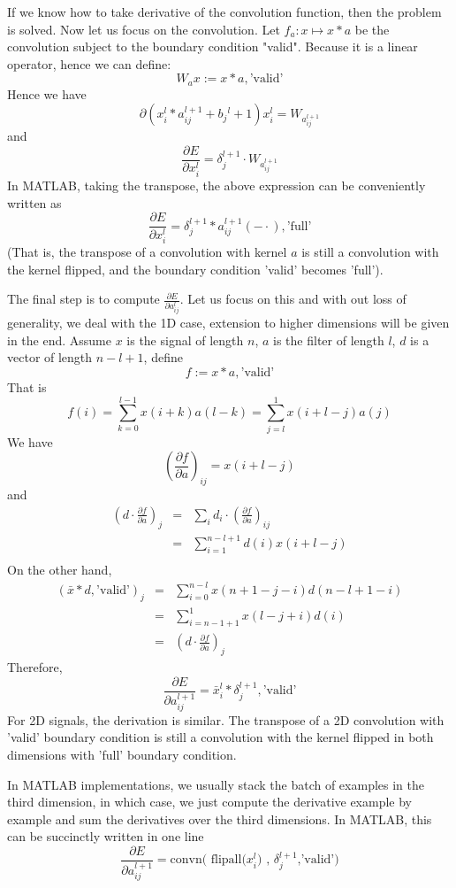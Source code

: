 \documentclass[12pt, reqno]{amsart}
\begin{document}
If we know how to take derivative of the convolution function, then
the problem is solved. Now let us focus on the convolution. Let $f_a :
x \mapsto x*a $ be the convolution subject to the boundary condition
"valid". Because it is a linear operator, hence we can define:
\[
W_a x:= x*a,\textrm{'valid'}
\]
Hence we have
\[
 \partial {(x_i^{l}*a_{ij}^{l+1}+b_j{^l+1})}{x_i^{l}}=W_{a_{ij}^{l+1}}
\]
and
\[
\frac{\partial E}{\partial x_{i}^{l}} = \delta_{j}^{l+1}\cdot W_{a_{ij}^{l+1}}
\]
In MATLAB, taking the transpose, the above expression can be
conveniently written as
\[
\frac{\partial E}{\partial x_{i}^{l}} = \delta_{j}^{l+1} * a_{ij}^{l+1}(-\cdot),\textrm{'full'}
\]
(That is, the transpose of a convolution with kernel $a$ is still a convolution with the kernel flipped, and the boundary condition 'valid' becomes 'full').

The final step is to compute $\frac{\partial E}{\partial a_{ij}^{l}}$. Let us focus on this and with out loss of generality, we deal with the 1D case, extension to higher dimensions will be given in the end.
Assume $x$ is the signal of length $n$, $a$ is the filter of length $l$, $d$ is a vector of length $n-l+1$, define
\[
f:=x*a, \textrm{'valid'}
\]
That is
\[
f(i)=\sum_{k=0}^{l-1}x(i+k)a(l-k)=\sum_{j=l}^{1} x(i+l-j)a(j)
\]
We have
\[
\left(\frac{\partial f}{\partial a}\right)_{ij}=x(i+l-j)
\]
and
\begin{eqnarray*}
	(d\cdot \frac{\partial f}{\partial a})_j &=& \sum_{i}d_i \cdot (\frac{\partial f}{\partial a})_{ij} \\
								&=&\sum_{i=1}^{n-l+1}d(i)x(i+l-j)\\
\end{eqnarray*}
On the other hand,
\begin{eqnarray*}
(\bar x*d,\textrm{'valid'} )_j &=& \sum_{i=0}^{n-l} x(n+1-j-i)d(n-l+1-i) \\
&= &\sum_{i=n-1+1}^{1}x(l-j+i)d(i)\\
&=& (d\cdot \frac{\partial f}{\partial a})_j 
\end{eqnarray*}
Therefore,
\[
\frac{\partial E}{\partial a_{ij}^{l+1}}=\bar{x}^{l}_i * \delta^{l+1}_{j}, \textrm{'valid'}
\]
For 2D signals, the derivation is similar. The transpose of a 2D convolution with 'valid' boundary condition is still a convolution with the kernel flipped in both dimensions with 'full' boundary condition. 

In MATLAB implementations, we usually stack the batch of examples in the third dimension, in which case, we just compute the derivative example by example and sum the derivatives over the third dimensions. In MATLAB, this can be succinctly written in one line
\[
	\frac{\partial E}{\partial a_{ij}^{l+1}}=\textrm{convn( flipall($x^{l}_i$) , $\delta^{l+1}_{j}$,'valid')}
\]
\end{document}
